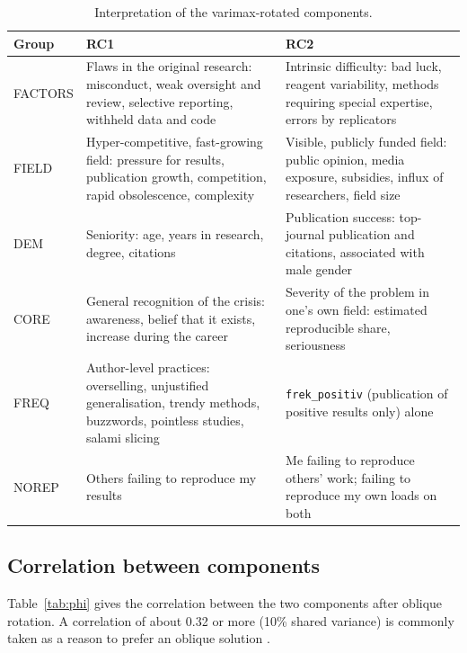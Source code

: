 \documentclass[11pt,a4paper]{article}
\newcommand{\var}[1]{\texttt{#1}}
\begin{document}
\begin{table}[ht]
\centering
\small
\begin{tabular}{@{}l L{5.8cm} L{5.8cm}@{}}
\toprule
Group & RC1 & RC2\\
\midrule
FACTORS & Flaws in the original research: misconduct, weak oversight and review, selective reporting, withheld data and code & Intrinsic difficulty: bad luck, reagent variability, methods requiring special expertise, errors by replicators\\[4pt]
FIELD & Hyper-competitive, fast-growing field: pressure for results, publication growth, competition, rapid obsolescence, complexity & Visible, publicly funded field: public opinion, media exposure, subsidies, influx of researchers, field size\\[4pt]
DEM & Seniority: age, years in research, degree, citations & Publication success: top-journal publication and citations, associated with male gender\\[4pt]
CORE & General recognition of the crisis: awareness, belief that it exists, increase during the career & Severity of the problem in one's own field: estimated reproducible share, seriousness\\[4pt]
FREQ & Author-level practices: overselling, unjustified generalisation, trendy methods, buzzwords, pointless studies, salami slicing & \var{frek\_positiv} (publication of positive results only) alone\\[4pt]
NOREP & Others failing to reproduce my results & Me failing to reproduce others' work; failing to reproduce my own loads on both\\
\bottomrule
\end{tabular}
\caption{Interpretation of the varimax-rotated components.}
\label{tab:dims}
\end{table}

\subsection{Correlation between components}
\label{sec:phi}

Table~\ref{tab:phi} gives the correlation between the two components after oblique rotation. A correlation of about 0.32 or more (10\% shared variance) is commonly taken as a reason to prefer an oblique solution \citep{tabachnick2013}.
\end{document}
